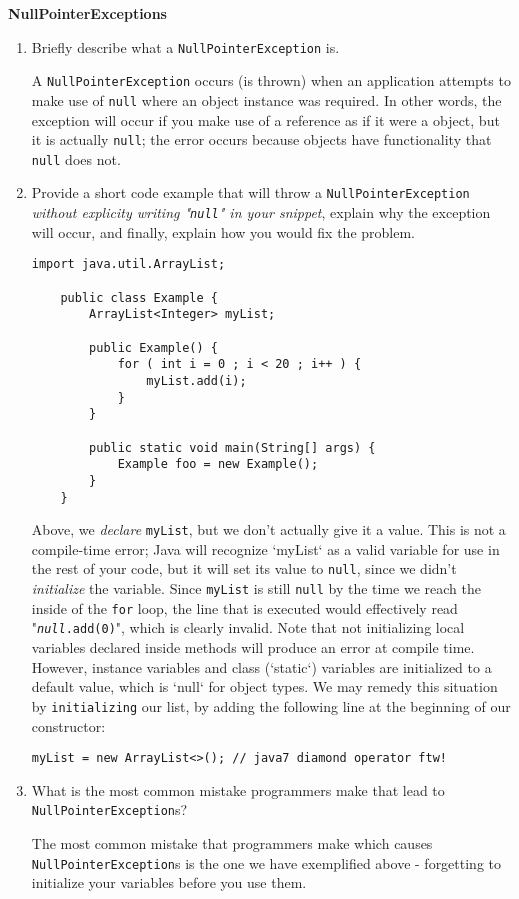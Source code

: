\textbf{NullPointerExceptions}
\begin{enumerate}
	\item Briefly describe what a \texttt{NullPointerException} is.\\
	\begin{answer}
		A \texttt{NullPointerException} occurs (is thrown) when an application attempts to make use of \texttt{null} where an object instance was required. In other words, the exception will occur if you make use of a reference as if it were a object, but it is actually \texttt{null}; the error occurs because objects have functionality that \texttt{null} does not.
	\end{answer}
	\item Provide a short code example that will throw a \texttt{NullPointerException} \textit{without explicity writing "\texttt{null}" in your snippet}, explain why the exception will occur, and finally, explain how you would fix the problem.
	\begin{answer}
		\begin{lstlisting}[numbers=none]
	import java.util.ArrayList;
	
	public class Example {
		ArrayList<Integer> myList;
		
		public Example() {
			for ( int i = 0 ; i < 20 ; i++ ) {
				myList.add(i);
			}
		}
		
		public static void main(String[] args) {
			Example foo = new Example();
		}
	}
		\end{lstlisting}
		Above, we \textit{declare} \texttt{myList}, but we don't actually give it a value. This is not a compile-time error; Java will recognize `myList` as a valid variable for use in the rest of your code, but it will set its value to \texttt{null}, since we didn't \textit{initialize} the variable. Since \texttt{myList} is still \texttt{null} by the time we reach the inside of the \texttt{for} loop, the line that is executed would effectively read "\texttt{\textit{null}.add(0)}", which is clearly invalid.
		Note that not initializing local variables declared inside methods will produce an error at compile time. However, instance variables and class (`static`) variables are initialized to a default value, which is `null` for object types.
		We may remedy this situation by \texttt{initializing} our list, by adding the following line at the beginning of our constructor:
		\begin{lstlisting}[numbers=none]
			myList = new ArrayList<>(); // java7 diamond operator ftw!
		\end{lstlisting}
	\end{answer}
	\item What is the most common mistake programmers make that lead to \texttt{NullPointerException}s?\\
	\begin{answer}
		The most common mistake that programmers make which causes \texttt{NullPointerException}s is the one we have exemplified above - forgetting to initialize your variables before you use them.
	\end{answer}
\end{enumerate}
